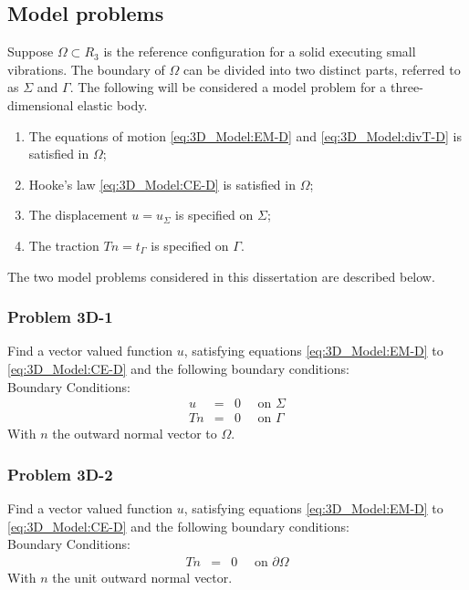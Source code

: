 \documentclass[../../main.tex]{subfiles}
\begin{document}
\subsection{Model problems}\label{ssec:3D_Model:ModelProblems}
Suppose $\Omega \subset R_3$ is the reference configuration for a solid
executing small vibrations. The boundary of $\Omega$ can be divided into two
distinct parts, referred to as $\Sigma$ and $\Gamma$. The following will be
considered a model problem for a three-dimensional elastic body.
\begin{enumerate}
	\item[] The equations of motion \eqref{eq:3D_Model:EM-D} and \eqref{eq:3D_Model:divT-D} is satisfied in $\Omega$;
	\item[] Hooke's law \eqref{eq:3D_Model:CE-D} is satisfied in $\Omega$;
	\item[] The displacement $u = u_\Sigma$ is specified on
		$\Sigma$;
	\item[] The traction $Tn = t_\Gamma$ is specified on
		$\Gamma$.
\end{enumerate} \label{sym:n}\label{sym:SigmaGamma}

The two model problems considered in this dissertation are described below.

\subsubsection{Problem 3D-1}\label{sssec:3D_Model:Problem3D1}
Find a vector valued function $u$, satisfying equations
\eqref{eq:3D_Model:EM-D} to \eqref{eq:3D_Model:CE-D} and the following boundary
conditions:\\

Boundary Conditions:
\begin{eqnarray*}
	u & = & 0 \quad \textrm{ on } \Sigma\\
	Tn & = & 0 \quad \textrm{ on } \Gamma
\end{eqnarray*} With $n$ the outward normal vector to $\Omega$.

\subsubsection{Problem 3D-2}\label{sssec:3D_Model:Problem3D2}
Find a vector valued function $u$, satisfying equations
\eqref{eq:3D_Model:EM-D} to \eqref{eq:3D_Model:CE-D} and the following boundary
conditions:\\

Boundary Conditions:
\begin{eqnarray*}
	Tn & = & 0 \quad \textrm{ on } \partial\Omega
\end{eqnarray*} With $n$ the unit outward normal vector.
\end{document}
